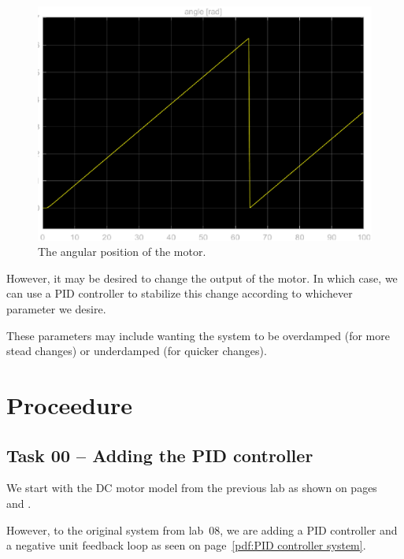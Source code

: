 \documentclass[12pt]{article}
\begin{document}
\begin{figure}
    \centering
    \includegraphics[width=\linewidth]{img/task05_angular_position.eps}
    \caption{The angular position of the motor.}
    \label{fig:angular position of motor}
\end{figure}

However, it may be desired to change the output of the motor. In which case, we can use a PID controller to stabilize this change according to whichever parameter we desire.

These parameters may include wanting the system to be overdamped (for more stead changes) or underdamped (for quicker changes).

\section{Proceedure}\label{sec:Proceedure}

\subsection{Task 00 -- Adding the PID controller}\label{ssc:dc motor model}

We start with the DC motor model from the previous lab as shown on pages~\pageref{pdf:dc motor model} and \pageref{pdf:integrators}.

However, to the original system from lab~08, we are adding a PID controller and a negative unit feedback loop as seen on page~\ref{pdf:PID controller system}.
\end{document}

